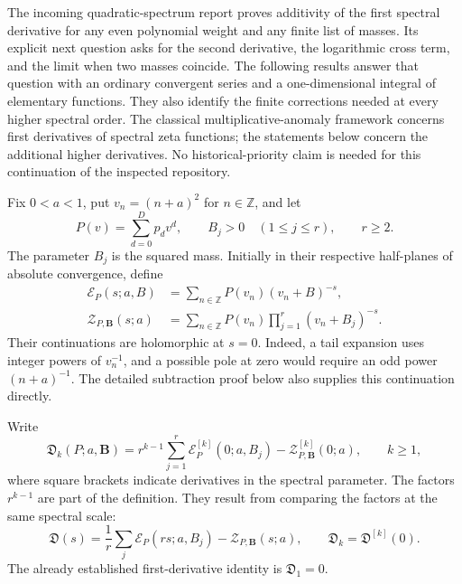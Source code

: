 \documentclass[11pt,a4paper]{article}
\numberwithin{equation}{section}
\theoremstyle{plain}
\theoremstyle{definition}
\theoremstyle{remark}
\begin{document}
The incoming quadratic-spectrum report \cite{Quadratic} proves additivity of the first
spectral derivative for any even polynomial weight and any finite list
of masses. Its explicit next question asks for the second derivative,
the logarithmic cross term, and the limit when two masses coincide.
The following results answer that question with an ordinary convergent
series and a one-dimensional integral of elementary functions. They also
identify the finite corrections needed at every higher spectral order.
The classical multiplicative-anomaly framework \cite{EVZ} concerns first derivatives
of spectral zeta functions; the statements below concern the additional
higher derivatives. No historical-priority claim is needed for this
continuation of the inspected repository.

Fix $0<a<1$, put $v_n=(n+a)^2$ for $n\in\mathbb Z$, and let
\[
 P(v)=\sum_{d=0}^{D}p_dv^d,\qquad B_j>0\quad(1\le j\le r),\qquad r\ge2.
\]
The parameter $B_j$ is the squared mass. Initially in their respective
half-planes of absolute convergence, define
\begin{align}
 \mathcal E_P(s;a,B)&=\sum_{n\in\mathbb Z}P(v_n)(v_n+B)^{-s},
 \label{msj:eq:E}\\
 \mathcal Z_{P,\boldsymbol B}(s;a)
 &=\sum_{n\in\mathbb Z}P(v_n)
                  \prod_{j=1}^{r}(v_n+B_j)^{-s}.
 \label{msj:eq:Z}
\end{align}
Their continuations are holomorphic at $s=0$. Indeed, a tail expansion
uses integer powers of $v_n^{-1}$, and a possible pole at zero would
require an odd power $(n+a)^{-1}$. The detailed subtraction proof below
also supplies this continuation directly.

Write
\begin{equation}
 \mathfrak D_k(P;a,\boldsymbol B)
 =r^{k-1}\sum_{j=1}^{r}\mathcal E_P^{[k]}(0;a,B_j)
       -\mathcal Z_{P,\boldsymbol B}^{[k]}(0;a),
 \qquad k\ge1,
 \label{msj:eq:defect}
\end{equation}
where square brackets indicate derivatives in the spectral parameter.
The factors $r^{k-1}$ are part of the definition. They result from
comparing the factors at the same spectral scale:
\begin{equation}
 \mathfrak D(s)=\frac1r\sum_j\mathcal E_P(rs;a,B_j)
                           -\mathcal Z_{P,\boldsymbol B}(s;a),
 \qquad \mathfrak D_k=\mathfrak D^{[k]}(0).
 \label{msj:eq:common-scale}
\end{equation}
The already established first-derivative identity is $\mathfrak D_1=0$.
\end{document}
